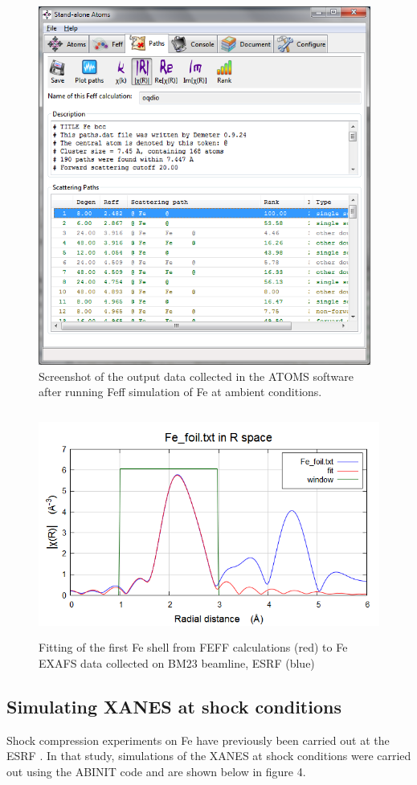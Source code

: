 \begin{figure}
  \includegraphics[width=4.3063in,height=4.6465in]{figures/Task42210-img002.png}
  \caption{%
    Screenshot of the output data collected in the ATOMS software after
    running Feff simulation of Fe at ambient conditions.
  }
  \label{fig:xafs_fig2}
\end{figure}

\begin{figure}
  \includegraphics[width=4.852in,height=2.9173in]{figures/Task42210-img003.png}
  \caption{%
    Fitting of the first Fe shell from FEFF calculations (red) to Fe EXAFS
    data collected on BM23 beamline, ESRF (blue)
  }
  \label{fig:xafs_fig3}
\end{figure}

\subsection{Simulating XANES at shock conditions}
Shock compression experiments on Fe have previously been carried out at the ESRF
\cite{Torchio2016}. In that study,
simulations of the XANES at shock conditions were carried out using the ABINIT
code and are shown below in figure 4.


